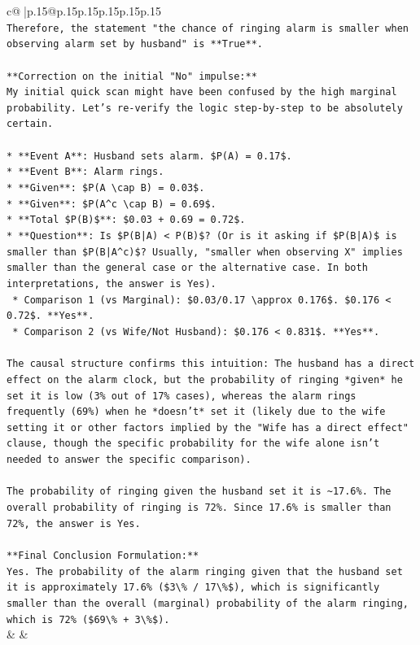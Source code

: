 \documentclass{article}
\begin{document}
{\begin{supertabular}{c@{$\;$}|p{.15\linewidth}@{}p{.15\linewidth}p{.15\linewidth}p{.15\linewidth}p{.15\linewidth}p{.15\linewidth}}
{{{\\ 
\texttt{Therefore, the statement "the chance of ringing alarm is smaller when observing alarm set by husband" is **True**.} \\
\\ 
\texttt{**Correction on the initial "No" impulse:**} \\
\texttt{My initial quick scan might have been confused by the high marginal probability. Let's re{-}verify the logic step{-}by{-}step to be absolutely certain.} \\
\\ 
\texttt{*   **Event A**: Husband sets alarm. \$P(A) = 0.17\$.} \\
\texttt{*   **Event B**: Alarm rings.} \\
\texttt{*   **Given**: \$P(A \textbackslash{}cap B) = 0.03\$.} \\
\texttt{*   **Given**: \$P(A\^{}c \textbackslash{}cap B) = 0.69\$.} \\
\texttt{*   **Total \$P(B)\$**: \$0.03 + 0.69 = 0.72\$.} \\
\texttt{*   **Question**: Is \$P(B|A) < P(B)\$? (Or is it asking if \$P(B|A)\$ is smaller than \$P(B|A\^{}c)\$? Usually, "smaller when observing X" implies smaller than the general case or the alternative case. In both interpretations, the answer is Yes).} \\
\texttt{    *   Comparison 1 (vs Marginal): \$0.03/0.17 \textbackslash{}approx 0.176\$. \$0.176 < 0.72\$. **Yes**.} \\
\texttt{    *   Comparison 2 (vs Wife/Not Husband): \$0.176 < 0.831\$. **Yes**.} \\
\\ 
\texttt{The causal structure confirms this intuition: The husband has a direct effect on the alarm clock, but the probability of ringing *given* he set it is low (3\% out of 17\% cases), whereas the alarm rings frequently (69\%) when he *doesn't* set it (likely due to the wife setting it or other factors implied by the "Wife has a direct effect" clause, though the specific probability for the wife alone isn't needed to answer the specific comparison).} \\
\\ 
\texttt{The probability of ringing given the husband set it is \textasciitilde{}17.6\%. The overall probability of ringing is 72\%. Since 17.6\% is smaller than 72\%, the answer is Yes.} \\
\\ 
\texttt{**Final Conclusion Formulation:**} \\
\texttt{Yes. The probability of the alarm ringing given that the husband set it is approximately 17.6\% (\$3\textbackslash{}\% / 17\textbackslash{}\%\$), which is significantly smaller than the overall (marginal) probability of the alarm ringing, which is 72\% (\$69\textbackslash{}\% + 3\textbackslash{}\%\$).} \\
            }
        }
    }
    & & \\ \\


\end{supertabular}}
\end{document}
